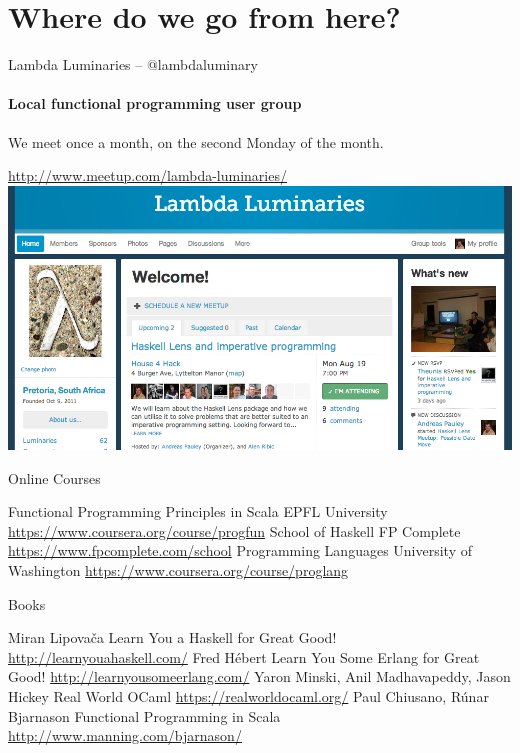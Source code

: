 \documentclass{beamer}
\begin{document}
\section{Where do we go from here?}

\begin{frame}{Lambda Luminaries -- @lambdaluminary}
  \framesubtitle{Local functional programming user group}
  We meet once a month, on the second Monday of the month.

  \url{http://www.meetup.com/lambda-luminaries/}
  \includegraphics[scale=0.3]{img/LambdaLuminariesScreenShot2013-08-09.png}
\end{frame}

\begin{frame}{Online Courses}

  \begin{thebibliography}{10}
      Functional Programming Principles in Scala
      \newblock EPFL University
      \newblock \url{https://www.coursera.org/course/progfun}
      School of Haskell
      \newblock FP Complete
      \newblock \url{https://www.fpcomplete.com/school}
      Programming Languages
      \newblock University of Washington
      \newblock \url{https://www.coursera.org/course/proglang}
  \end{thebibliography}

\end{frame}

\begin{frame}{Books}

  \begin{thebibliography}{10}
      Miran Lipovača
      \newblock Learn You a Haskell for Great Good!
      \newblock \url{http://learnyouahaskell.com/}
      Fred Hébert
      \newblock Learn You Some Erlang for Great Good!
      \newblock \url{http://learnyousomeerlang.com/}
      Yaron Minski, Anil Madhavapeddy, Jason Hickey
      \newblock Real World OCaml
      \newblock \url{https://realworldocaml.org/}
      Paul Chiusano, Rúnar Bjarnason
      \newblock Functional Programming in Scala
      \newblock \url{http://www.manning.com/bjarnason/}
  \end{thebibliography}

\end{frame}
\end{document}
